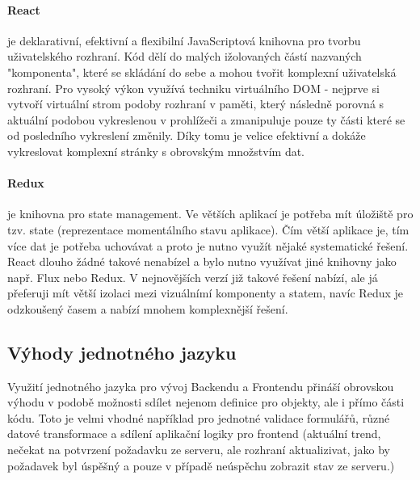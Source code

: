 \paragraph{React} je deklarativní, efektivní a flexibilní JavaScriptová knihovna pro tvorbu uživatelského rozhraní. Kód dělí do malých ižolovaných částí nazvaných "komponenta", které se skládání do sebe a mohou tvořit komplexní uživatelská rozhraní. Pro vysoký výkon využívá techniku virtuálního DOM - nejprve si vytvoří virtuální strom podoby rozhraní v paměti, který následně porovná s aktuální podobou vykreslenou v prohlížeči a zmanipuluje pouze ty části které se od posledního vykreslení změnily. Díky tomu je velice efektivní a dokáže vykreslovat komplexní stránky s obrovským množstvím dat.

\paragraph{Redux} je knihovna pro state management. Ve větších aplikací je potřeba mít úložiště pro tzv. state (reprezentace momentálního stavu aplikace). Čím větší aplikace je, tím více dat je potřeba uchovávat a proto je nutno využít nějaké systematické řešení. React dlouho žádné takové nenabízel a bylo nutno využívat jiné knihovny jako např. Flux nebo Redux. V nejnovějších verzí již takové řešení nabízí, ale já přeferuji mít větší izolaci mezi vizuálnímí komponenty a statem, navíc Redux je odzkoušený časem a nabízí mnohem komplexnější řešení.

\subsection{Výhody jednotného jazyku}
Využití jednotného jazyka pro vývoj Backendu a Frontendu přináší obrovskou výhodu v podobě možnosti sdílet nejenom definice pro objekty, ale i přímo části kódu. Toto je velmi vhodné například pro jednotné validace formulářů, různé datové transformace a sdílení aplikační logiky pro frontend  (aktuální trend, nečekat na potvrzení požadavku ze serveru, ale rozhraní aktualizivat, jako by požadavek byl úspěšný a pouze v případě neúspěchu zobrazit stav ze serveru.)

